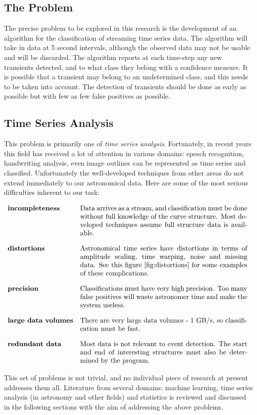 \documentclass[11pt]{article}
\begin{document}
	\subsection{The Problem}
	The precise problem to be explored in this research is the development of an algorithm for the classification of streaming time series data. The algorithm will take in data at 5 second intervals, although the observed data may not be usable and will be discarded. The algorithm reports at each time-step any new transients detected, and to what class they belong with a confidence measure. It is possible that a transient may belong to an undetermined class, and this needs to be taken into account. The detection of transients should be done as early as possible but with few as few false positives as possible.
	
	\subsection{Time Series Analysis}
	This problem is primarily one of \emph{time series analysis}. Fortunately, in recent years this field has received a lot of attention in various domains: speech recognition, handwriting analysis, even image outlines can be represented as time series and classified. Unfortunately the well-developed techniques from other areas do not extend immediately to our astronomical data. Here are some of the most serious difficulties inherent to our task:
	\begin{table*}[h!]
	\centering
	$\begin{array}{lp{0.7\textwidth}}
		\textbf{incompleteness} & Data arrives as a stream, and classification must be done without full knowledge of the curve structure. Most developed techniques assume full structure data is available. \vspace{10pt} \\
		\textbf{distortions} & Astronomical time series have distortions in terms of amplitude scaling, time warping, noise and missing data. See this figure~\ref{fig:distortions} for some examples of these complications. \vspace{10pt} \\
		\textbf{precision} & Classifications must have very high precision. Too many false positives will waste astronomer time and make the system useless. \vspace{10pt} \\
		\textbf{large data volumes} & There are very large data volumes - 1 GB/s, so classification must be fast. \vspace{10pt} \\ 
		\textbf{redundant data} & Most data is not relevant to event detection. The start and end of interesting structures must also be determined by the program. \\
	\end{array}$
	\end{table*}
	This set of problems is not trivial, and no individual piece of research at present addresses them all. Literature from several domains: machine learning, time series analysis (in astronomy and other fields) and statistics is reviewed and discussed in the following sections with the aim of addressing the above problems.
		
\end{document}
